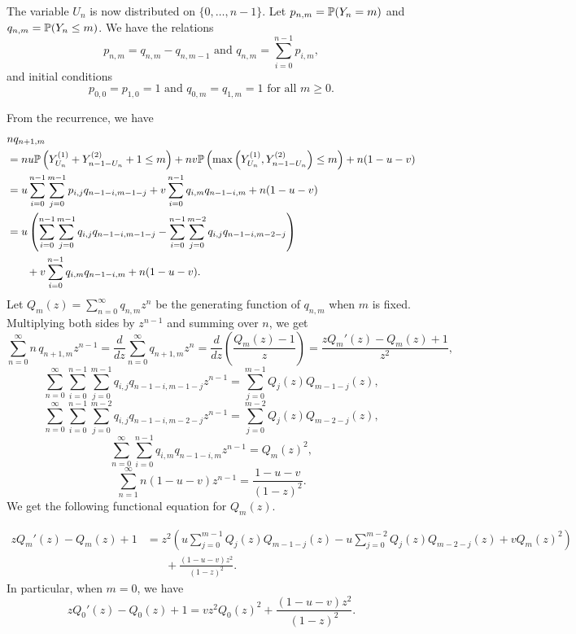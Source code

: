 The variable $U_n$ is now distributed on $\{0, \ldots, n-1\}$. Let $p_{n,m} = \mathbb{P}(Y_n = m)$ and $q_{n,m} = \mathbb{P}(Y_n\le m)$. We have the relations
$$p_{n,m} = q_{n,m} - q_{n, m-1} \text{ and } q_{n,m}=\sum\limits_{i=0}^{n-1} p_{i,m},$$
and initial conditions
$$p_{0,0} = p_{1,0} = 1 \text{ and } q_{0,m} = q_{1,m} = 1 \text{ for all } m \ge 0.$$

From the recurrence, we have
\begin{align*}
   & nq_{n+1, m}                                                                                                                                              \\
   & = nu \mathbb{P}\left(Y_{U_n}^{(1)} + Y_{n-1-U_n}^{(2)} + 1 \le m\right) + nv \mathbb{P}\left(\max\left(Y_{U_n}^{(1)}, Y_{n-1-U_n}^{(2)}\right) \le m\right) + n(1-u-v) \\
   & = u\sum_{i=0}^{n-1} \sum_{j=0}^{m-1} p_{i,j}q_{n-1-i, m-1-j} + v\sum_{i=0}^{n-1} q_{i, m} q_{n-1-i, m}+n(1-u-v)                                          \\
   & = u\left(\sum_{i=0}^{n-1} \sum_{j=0}^{m-1} q_{i, j} q_{n-1-i,m-1-j} - \sum_{i=0}^{n-1} \sum_{j=0}^{m-2} q_{i, j}q_{n-1-i,m-2-j} \right)                  \\
   & \,\,\,\,\,\,\,\,\,\,\,+ v\sum_{i=0}^{n-1} q_{i, m} q_{n-1-i, m}+n(1-u-v).
\end{align*}
Let $Q_m(z) = \sum\limits_{n=0}^\infty q_{n,m}z^n$ be the generating function of $q_{n,m}$ when $m$ is fixed. Multiplying both sides by $z^{n-1}$ and summing over $n$, we get
$$\sum_{n=0}^\infty n \, q_{n+1, m} z^{n-1} = \frac{d}{dz} \sum_{n=0}^\infty q_{n+1, m} z^{n} = \frac{d}{dz}\left( \frac{Q_m(z) - 1}{z} \right) = \frac{z Q_m'(z) - Q_m(z) + 1}{z^2},$$
$$\sum_{n=0}^{\infty} \sum_{i=0}^{n-1} \sum_{j=0}^{m-1} q_{i, j} q_{n-1-i, m-1-j}z^{n-1} = \sum\limits_{j=0}^{m-1} Q_j(z)Q_{m-1-j}(z),$$
$$\sum_{n=0}^{\infty} \sum_{i=0}^{n-1} \sum_{j=0}^{m-2} q_{i, j} q_{n-1-i, m-2-j}z^{n-1}  = \sum\limits_{j=0}^{m-2} Q_j(z)Q_{m-2-j}(z),$$
$$\sum_{n=0}^\infty\sum_{i=0}^{n-1} q_{i, m} q_{n-1-i, m}z^{n-1} = Q_m(z)^2,$$
$$\sum_{n=1}^\infty n(1-u-v)z^{n-1} = \frac{1-u-v}{(1-z)^2}.$$
We get the following functional equation for $Q_m(z)$.

\begin{equation}
  \label{eq:yield_indicator_functional_equation}
  \begin{aligned}
    z Q_m'(z) - Q_m(z) + 1
     & = z^2\left(u \sum_{j=0}^{m-1} Q_j(z)Q_{m-1-j}(z) - u \sum_{j=0}^{m-2} Q_j(z)Q_{m-2-j}(z) + v Q_m(z)^2\right) \\
     & \,\,\,\,\,\,\,\,\,\,+ \frac{(1-u-v)z^2}{(1-z)^2}.
  \end{aligned}
\end{equation}
In particular, when $m=0$, we have
\begin{equation}
  \label{eq:yield_indicator_functional_equation_m0}
  z Q_0'(z) - Q_0(z) + 1 = v z^2 Q_0(z)^2 + \frac{(1-u-v)z^2}{(1-z)^2}.
\end{equation}

